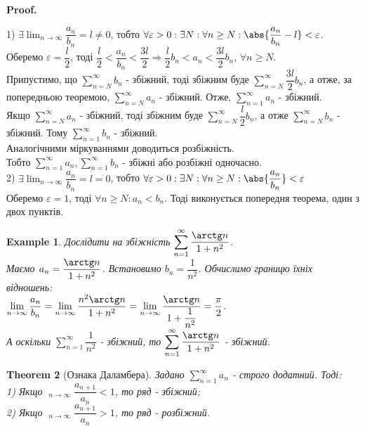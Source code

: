 \documentclass[a4paper, 10pt]{article}
\makeatletter
\DeclareMathOperator*\uplim{\overline{lim}}
\DeclareMathOperator*\downlim{\underline{lim}}
\def\huge{\displaystyle}
\def\qed{$\blacksquare$}
\theoremstyle{theoremdd}
\newtheorem{theorem}{Theorem}[subsection]
\theoremstyle{theoremdd}
\theoremstyle{theoremdd}
\theoremstyle{theoremdd}
\theoremstyle{theoremdd}
\newtheorem{example}[theorem]{Example}
\theoremstyle{theoremdd}
\theoremstyle{theoremdd}
\theoremstyle{theoremdd}
\theoremstyle{theoremdd}
\renewenvironment{proof}[1][Proof.\\]{\par
\pushQED{\hfill \qed}%
\normalfont \topsep6\p@\@plus6\p@\relax
\trivlist
\item\relax
{\bfseries
#1\@addpunct{.}}\hspace\labelsep\ignorespaces
}{%
\popQED\endtrivlist\@endpefalse
}
\makeatother
\begin{document}
\begin{proof}
1) $\exists \huge \lim_{n \to \infty} \dfrac{a_n}{b_n} = l \neq 0$, тобто $\forall \varepsilon > 0: \exists N: \forall n \geq N: \abs{\dfrac{a_n}{b_n}-l} < \varepsilon$.\\
Оберемо $\varepsilon = \dfrac{l}{2}$, тоді $\dfrac{l}{2} < \dfrac{a_n}{b_n} < \dfrac{3l}{2} \Rightarrow \dfrac{l}{2}b_n < a_n < \dfrac{3l}{2} b_n$, $\forall n \geq N$.\\
Припустимо, що $\huge \sum_{n=N}^{\infty} b_n$ - збіжний, тоді збіжним буде $\huge \sum_{n=N}^{\infty} \dfrac{3l}{2} b_n$, а отже, за попередньою теоремою, $\huge \sum_{n=N}^{\infty} a_n$ - збіжний. Отже, $\huge\sum_{n=1}^\infty a_n$ - збіжний.\\
Якщо $\huge\sum_{n = N}^\infty a_n$ - збіжний, тоді збіжним буде $\huge\sum_{n = N}^\infty \dfrac{l}{2} b_n$, а отже $\huge\sum_{n=N}^\infty b_n$ - збіжний. Тому $\huge\sum_{n=1}^\infty b_n$ - збіжний.\\
Аналогічними міркуваннями доводиться розбіжність.\\
Тобто $\huge\sum_{n=1}^\infty a_n, \huge\sum_{n=1}^\infty b_n$ - збіжні або розбіжні одночасно.
\bigskip \\
2) $\exists \huge \lim_{n \to \infty} \dfrac{a_n}{b_n} = l = 0$, тобто $\forall \varepsilon > 0: \exists N: \forall n \geq N: \abs{\dfrac{a_n}{b_n}} < \varepsilon$\\
Оберемо $\varepsilon = 1$, тоді $\forall n \geq N: a_n < b_n$. Тоді виконується попередня теорема, один з двох пунктів.
\end{proof}

\begin{example}
Дослідити на збіжність $\huge\sum_{n=1}^\infty \dfrac{\arctg n}{1+n^2}$.\\
Маємо $a_n = \dfrac{\arctg n}{1+n^2}$. Встановимо $b_n = \dfrac{1}{n^2}$. Обчислимо границю їхніх відношень:\\
$\huge\lim_{n \to \infty} \dfrac{a_n}{b_n} = \lim_{n \to \infty} \dfrac{n^2 \arctg n}{1+n^2} = \lim_{n \to \infty} \dfrac{\arctg n}{1 + \dfrac{1}{n^2}} = \dfrac{\pi}{2}$.\\
А оскільки $\huge\sum_{n=1}^\infty \dfrac{1}{n^2}$ - збіжний, то $\huge\sum_{n=1}^\infty \dfrac{\arctg n}{1+n^2}$ - збіжний.
\end{example}

\begin{theorem}[Ознака Даламбера]
Задано $\huge \sum_{n=1}^{\infty} a_n$ - строго додатний. Тоді:\\
1) Якщо $\huge\uplim_{n \to \infty} \dfrac{a_{n+1}}{a_n} <1$, то ряд - збіжний;\\
2) Якщо $\huge\downlim_{n \to \infty} \dfrac{a_{n+1}}{a_n} >1$, то ряд - розбіжний.
\end{theorem}
\end{document}
